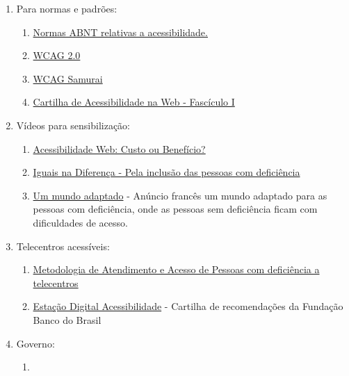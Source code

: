 \documentclass[
  12pt,
  openright,
  twoside,
  a4paper,
  english,
  french,
  spanish,
  brazil
]{abntex2}
\begin{document}
\begin{enumerate}
  \item Para normas e padrões:
  \begin{enumerate}
    \item
      \href{
        http://www.abnt.org.br/noticias/4099-normas-de-acessibilidade
      }{Normas ABNT relativas a acessibilidade.}
    \item \href{https://www.w3.org/Translations/WCAG20-pt-PT}{WCAG 2.0}
    \item
      \href{
        https://www.maujor.com/wcagsamurai/wcagsamurai-pt-br.html
      }{WCAG Samurai}
    \item
      \href{
        https://nic.br/publicacao/cartilha-de-acessibilidade-na-web-fasciculo-i
      }{Cartilha de Acessibilidade na Web - Fascículo I}
  \end{enumerate}
  \item Vídeos para sensibilização:
  \begin{enumerate}
    \item
      \href{
        https://www.youtube.com/watch?v=zNVrNo7MxsA
      }{Acessibilidade Web: Custo ou Benefício?}
    \item
      \href{
        http://www.youtube.com/watch?v=tsfaaHrw0Wc
      }{Iguais na Diferença - Pela inclusão das pessoas com deficiência}
    \item
      \href{
        http://www.bengalalegal.com/mundoadaptado.php
      }{Um mundo adaptado} - Anúncio francês um mundo adaptado para as pessoas
      com deficiência, onde as pessoas sem deficiência ficam com dificuldades de
      acesso.
  \end{enumerate}
  \item Telecentros acessíveis:
  \begin{enumerate}
    \item
      \href{
        http://www.acessobrasil.org.br/index.php?itemid=876
      }{
        Metodologia de Atendimento e Acesso de Pessoas com deficiência a
        telecentros
      }
    \item
      \href{
        https://www.gov.br/governodigital/pt-br/acessibilidade-e-usuario/acessibilidade-digital/cartilhaacessibilidadefbb.pdf
      }{Estação Digital Acessibilidade} - Cartilha de recomendações da Fundação
      Banco do Brasil
  \end{enumerate}
  \item Governo:
  \begin{enumerate}
    \item

\end{enumerate}
\end{enumerate}
\end{document}
